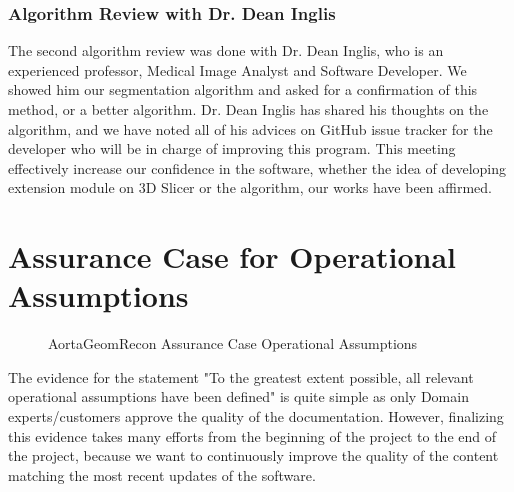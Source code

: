 \subsubsection{Algorithm Review with Dr. Dean Inglis}

The second algorithm review was done with Dr. Dean Inglis, who is an experienced professor, Medical Image Analyst and Software Developer. We showed him our segmentation algorithm and asked for a confirmation of this method, or a better algorithm. Dr. Dean Inglis has shared his thoughts on the algorithm, and we have noted all of his advices on GitHub issue tracker for the developer who will be in charge of improving this program. This meeting effectively increase our confidence in the software, whether the idea of developing extension module on 3D Slicer or the algorithm, our works have been affirmed.


\section{Assurance Case for Operational Assumptions}

\begin{figure}[H]
    \centering
    \caption[AortaGeomRecon Assurance Case Operational Assumptions]{AortaGeomRecon Assurance Case Operational Assumptions}
    \label{fig_agr_ac_gba}
\end{figure}

The evidence for the statement "To the greatest extent possible, all relevant operational assumptions have been defined" is quite simple as only Domain experts/customers approve the quality of the documentation. However, finalizing this evidence takes many efforts from the beginning of the project to the end of the project, because we want to continuously improve the quality of the content matching the most recent updates of the software.

